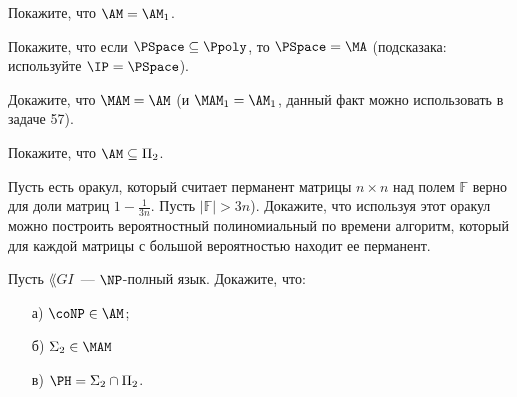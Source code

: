 \begin{ptask}{57}
    Покажите, что $\AM = \AM_1$.
\end{ptask}

\begin{ptask}{59}
    Покажите, что если $\PSpace \subseteq \Ppoly$, то $\PSpace = \MA$ (подсказака: используйте $\IP = \PSpace$).
\end{ptask}

\begin{ptask}{65}
    Докажите, что $\MAM = \AM$ (и $\MAM_1 = \AM_1$, данный факт можно использовать в задаче 57).
\end{ptask}

\begin{ptask}{66}
    Покажите, что $\AM \subseteq \Pi_2$.
\end{ptask}

\begin{ptask}{67}
    Пусть есть оракул, который считает перманент матрицы $n \times n$ над полем $\mathbb{F}$ верно для доли матриц
    $1 - \frac{1}{3n}$. Пусть $|\mathbb{F}| > 3n$). Докажите, что используя этот оракул можно построить вероятностный
    полиномиальный по времени алгоритм, который для каждой матрицы с большой вероятностью находит ее перманент.
\end{ptask}


\begin{ptask}{69}
    Пусть $\lang{GI}$~--- $\NP$-полный язык. Докажите, что:
    \begin{enumerate}[topsep = 0pt, itemsep = -1ex]
        \item [а)] $\coNP \in \AM$;
        \item [б)] $\Sigma_2 \in \MAM$
        \item [в)] $\PH = \Sigma_2 \cap \Pi_2$.
    \end{enumerate}
\end{ptask}
